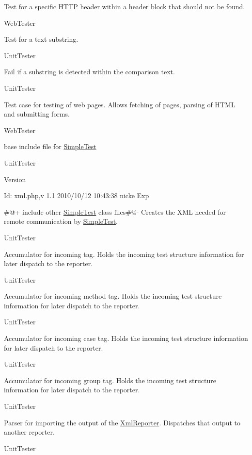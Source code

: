 Test for a specific HTTP header within a header block that should not be found.

WebTester

Test for a text substring.

UnitTester

Fail if a substring is detected within the comparison text.

UnitTester

Test case for testing of web pages. Allows fetching of pages, parsing of HTML and submitting forms.

WebTester

base include file for \hyperlink{class_simple_test}{SimpleTest}

UnitTester \begin{DoxyVersion}{Version}

\end{DoxyVersion}
\begin{DoxyParagraph}{Id:}
xml.php,v 1.1 2010/10/12 10:43:38 nicke Exp 
\end{DoxyParagraph}


\#@+ include other \hyperlink{class_simple_test}{SimpleTest} class files\#@-\/ Creates the XML needed for remote communication by \hyperlink{class_simple_test}{SimpleTest}.

UnitTester

Accumulator for incoming tag. Holds the incoming test structure information for later dispatch to the reporter.

UnitTester

Accumulator for incoming method tag. Holds the incoming test structure information for later dispatch to the reporter.

UnitTester

Accumulator for incoming case tag. Holds the incoming test structure information for later dispatch to the reporter.

UnitTester

Accumulator for incoming group tag. Holds the incoming test structure information for later dispatch to the reporter.

UnitTester

Parser for importing the output of the \hyperlink{class_xml_reporter}{XmlReporter}. Dispatches that output to another reporter.

UnitTester 